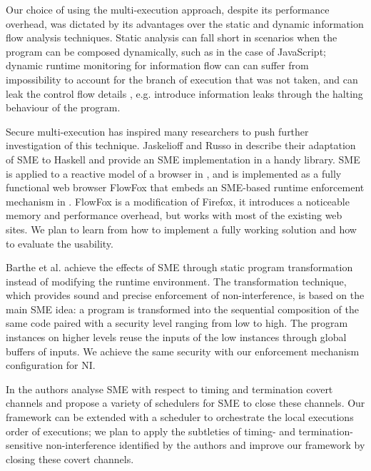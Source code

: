 \documentclass[10pt,a4paper,oneside]{article}
\begin{document}
Our choice of using the multi-execution approach, despite its performance overhead, was dictated by its advantages over the static and dynamic information flow analysis techniques. Static analysis can fall short in scenarios when the program can be composed dynamically, such as in the case of JavaScript; dynamic runtime monitoring for information flow can can suffer from impossibility to account for the branch of execution that was not taken, and can leak the control flow details \cite{Sabe-Myer-2003}, e.g. introduce information leaks through the halting behaviour of the program. 


Secure multi-execution \cite{Devr-Pies-10-IEEESP} has inspired many researchers to push further investigation of this technique. Jaskelioff and Russo in \cite{Jask-Russ-2012} describe their adaptation of SME to Haskell and provide an SME implementation in a handy library. SME is applied to a reactive model of a browser in \cite{Biel-etal-11-NSS}, and is implemented as a fully functional web browser FlowFox that embeds an SME-based runtime enforcement mechanism  in \cite{DeGroef-etal-12-CCS}. FlowFox is a modification of Firefox, it introduces a noticeable memory and performance overhead, but works with most of the existing web sites. We plan to learn from \cite{DeGroef-etal-12-CCS} how to implement a fully working solution and how to evaluate the usability.

Barthe et al. \cite{Bart-Crespo-FMOODS-2012} achieve the effects of SME through static program transformation instead of modifying the runtime environment. The transformation technique, which provides sound and precise enforcement of non-interference, is based on the main SME idea: a program is transformed into the sequential composition of the same code paired with a security level ranging from low to high. The program instances on higher levels reuse the inputs of the low instances through global buffers of inputs. We achieve the same security with our enforcement mechanism configuration for NI.

In \cite{Kash-Wied-Hard-11-SSP} the authors analyse SME with respect to timing and termination covert channels and propose a variety of schedulers for SME to close these channels. Our framework can be extended with a scheduler to orchestrate the local executions order of executions; we plan to apply the subtleties of timing- and termination-sensitive non-interference identified by the authors and improve our framework by closing these covert channels.
\end{document}
